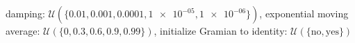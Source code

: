 damping: $\mathcal{U}(\{\num[scientific-notation=true]{0.01},\num[scientific-notation=true]{0.001},\num[scientific-notation=true]{0.0001},\num[scientific-notation=true]{1e-05},\num[scientific-notation=true]{1e-06}\})$, exponential moving average: $\mathcal{U}(\{\num[scientific-notation=false]{0},\num[scientific-notation=true]{0.3},\num[scientific-notation=true]{0.6},\num[scientific-notation=true]{0.9},\num[scientific-notation=true]{0.99}\})$, initialize Gramian to identity: $\mathcal{U}(\{\text{no},\text{yes}\})$
